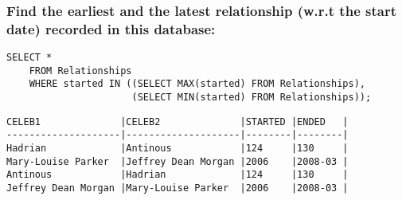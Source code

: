 \documentclass{article}
\begin{document}
        \subsubsection*{Find the earliest and the latest relationship (w.r.t the start date) recorded in this
database:}
        \begin{verbatim}
SELECT *
    FROM Relationships
    WHERE started IN ((SELECT MAX(started) FROM Relationships),
                      (SELECT MIN(started) FROM Relationships));\end{verbatim}
    
        \begin{verbatim}
CELEB1              |CELEB2              |STARTED |ENDED   |
--------------------|--------------------|--------|--------|
Hadrian             |Antinous            |124     |130     |
Mary-Louise Parker  |Jeffrey Dean Morgan |2006    |2008-03 |
Antinous            |Hadrian             |124     |130     |
Jeffrey Dean Morgan |Mary-Louise Parker  |2006    |2008-03 |
        \end{verbatim}
        
        
\end{document}
